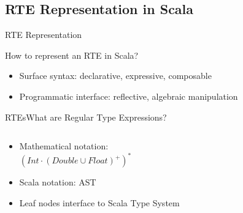 \subsection{RTE Representation in Scala}


{  
\begin{frame}{ RTE Representation}

  How to represent an RTE in Scala?


  \medskip
  
  \begin{itemize}
  \item Surface syntax: declarative, expressive, composable
  \item Programmatic interface: reflective, algebraic manipulation
  \end{itemize}
\end{frame}
}

\newsavebox\exnotebox
\begin{lrbox}{\exnotebox}
  \begin{minipage}{6.5cm}
    
  \end{minipage}
\end{lrbox}


\begin{frame}{RTEs}{What are Regular Type Expressions?}
  \begin{columns}
    \begin{column}{0.55\textwidth}
  \begin{itemize}
  \item Mathematical notation:\\
  \quad\textcolor{greeny}{$(Int \cdot (Double \cup Float)^+)^*$}
  \item Scala notation: AST\\
    \usebox\exnotebox
  \item Leaf nodes interface to Scala Type System
  \end{itemize}
    \end{column}%
    \begin{column}{0.45\textwidth}
      \scalebox{0.7}{}
    \end{column}%
  \end{columns}%
\end{frame}


\newsavebox\exampleAbox
\begin{lrbox}{\exampleAbox}
  \begin{minipage}{12cm}
    
  \end{minipage}
\end{lrbox}



